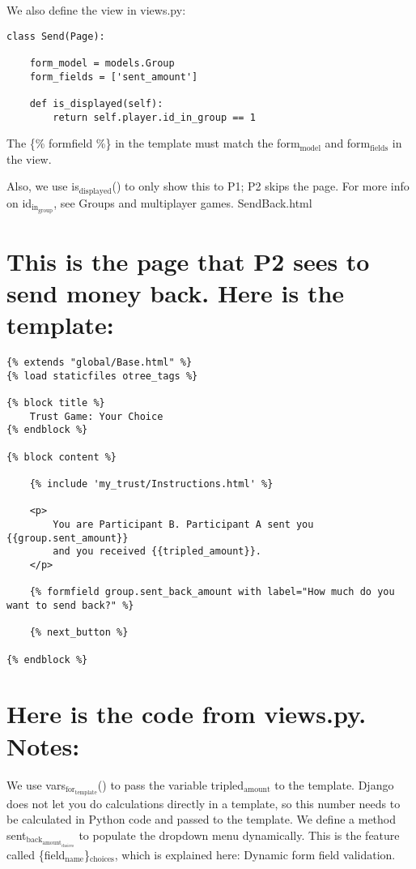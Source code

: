 \documentclass[11pt]{article}
\begin{document}
We also define the view in views.py:

\begin{verbatim}
class Send(Page):

    form_model = models.Group
    form_fields = ['sent_amount']

    def is_displayed(self):
        return self.player.id_in_group == 1
\end{verbatim}

The \{\% formfield \%\} in the template must match the form\(_{\text{model}}\) and form\(_{\text{fields}}\) in the view.

Also, we use is\(_{\text{displayed}}\)() to only show this to P1; P2 skips the page. For more info on id\(_{\text{in}}_{\text{group}}\), see Groups and multiplayer games.
SendBack.html

\section{This is the page that P2 sees to send money back. Here is the template:}
\label{sec:orgheadline6}

\begin{verbatim}
{% extends "global/Base.html" %}
{% load staticfiles otree_tags %}

{% block title %}
    Trust Game: Your Choice
{% endblock %}

{% block content %}

    {% include 'my_trust/Instructions.html' %}

    <p>
        You are Participant B. Participant A sent you {{group.sent_amount}}
        and you received {{tripled_amount}}.
    </p>

    {% formfield group.sent_back_amount with label="How much do you want to send back?" %}

    {% next_button %}

{% endblock %}
\end{verbatim}

\section{Here is the code from views.py. Notes:}
\label{sec:orgheadline7}

We use vars\(_{\text{for}}_{\text{template}}\)() to pass the variable tripled\(_{\text{amount}}\) to the template. Django does not let you do calculations directly in a template, so this number needs to be calculated in Python code and passed to the template.
We define a method sent\(_{\text{back}}_{\text{amount}}_{\text{choices}}\) to populate the dropdown menu dynamically. This is the feature called \{field\(_{\text{name}}\)\}\(_{\text{choices}}\), which is explained here: Dynamic form field validation.
\end{document}
